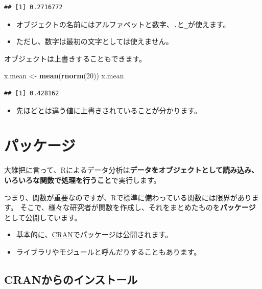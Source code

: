 \documentclass[]{bxjsreport}
\newenvironment{Shaded}{\begin{snugshade}}{\end{snugshade}}
\newcommand{\DecValTok}[1]{\textcolor[rgb]{0.00,0.00,0.81}{#1}}
\newcommand{\KeywordTok}[1]{\textcolor[rgb]{0.13,0.29,0.53}{\textbf{#1}}}
\newcommand{\NormalTok}[1]{#1}
\newcommand{\StringTok}[1]{\textcolor[rgb]{0.31,0.60,0.02}{#1}}
\providecommand{\tightlist}{%
  \setlength{\itemsep}{0pt}\setlength{\parskip}{0pt}}
\let\asdf\section
\renewcommand{\section}{\chapter}
\let\asdff\subsection
\renewcommand{\subsection}{\asdf}
\renewcommand{\subsubsection}{\asdff}
\begin{document}
\begin{verbatim}
## [1] 0.2716772
\end{verbatim}

\begin{itemize}
\tightlist
\item
  オブジェクトの名前にはアルファベットと数字、\texttt{.}と\texttt{\_}が使えます。
\item
  ただし、数字は最初の文字としては使えません。
\end{itemize}

オブジェクトは上書きすることもできます。

\begin{Shaded}
\begin{Highlighting}[]
\NormalTok{x.mean <-}\StringTok{ }\KeywordTok{mean}\NormalTok{(}\KeywordTok{rnorm}\NormalTok{(}\DecValTok{20}\NormalTok{))}
\NormalTok{x.mean}
\end{Highlighting}
\end{Shaded}

\begin{verbatim}
## [1] 0.428162
\end{verbatim}

\begin{itemize}
\tightlist
\item
  先ほどとは違う値に上書きされていることが分かります。
\end{itemize}

\hypertarget{ux30d1ux30c3ux30b1ux30fcux30b8}{%
\subsection{パッケージ}\label{ux30d1ux30c3ux30b1ux30fcux30b8}}

大雑把に言って、Rによるデータ分析は\textbf{データをオブジェクトとして読み込み、いろいろな関数で処理を行うこと}で実行します。

つまり、関数が重要なのですが、Rで標準に備わっている関数には限界があります。
そこで、様々な研究者が関数を作成し、それをまとめたものを\textbf{パッケージ}として公開しています。

\begin{itemize}
\tightlist
\item
  基本的に、\href{https://cran.r-project.org/}{CRAN}でパッケージは公開されます。
\item
  ライブラリやモジュールと呼んだりすることもあります。
\end{itemize}

\hypertarget{cranux304bux3089ux306eux30a4ux30f3ux30b9ux30c8ux30fcux30eb}{%
\subsubsection{CRANからのインストール}\label{cranux304bux3089ux306eux30a4ux30f3ux30b9ux30c8ux30fcux30eb}}
\end{document}
